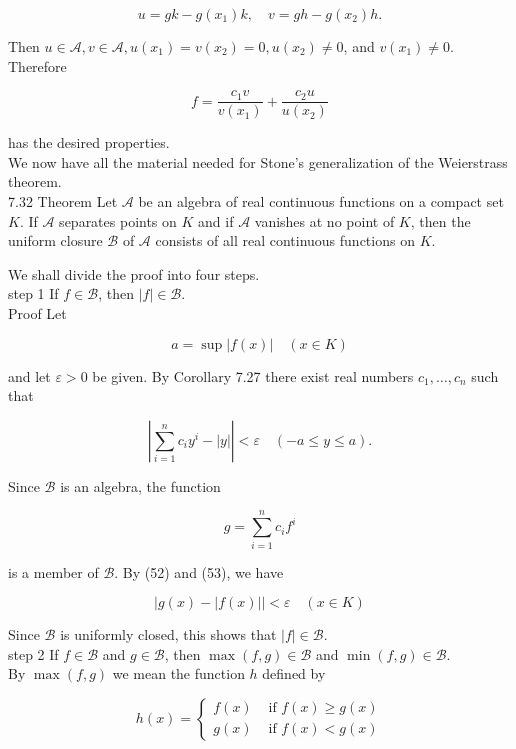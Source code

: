 \documentclass[10pt]{article}
\begin{document}
$$
u=g k-g\left(x_{1}\right) k, \quad v=g h-g\left(x_{2}\right) h .
$$

Then $u \in \mathscr{A}, v \in \mathscr{A}, u\left(x_{1}\right)=v\left(x_{2}\right)=0, u\left(x_{2}\right) \neq 0$, and $v\left(x_{1}\right) \neq 0$. Therefore

$$
f=\frac{c_{1} v}{v\left(x_{1}\right)}+\frac{c_{2} u}{u\left(x_{2}\right)}
$$

has the desired properties.\\
We now have all the material needed for Stone's generalization of the Weierstrass theorem.\\
7.32 Theorem Let $\mathscr{A}$ be an algebra of real continuous functions on a compact set $K$. If $\mathscr{A}$ separates points on $K$ and if $\mathscr{A}$ vanishes at no point of $K$, then the uniform closure $\mathscr{B}$ of $\mathscr{A}$ consists of all real continuous functions on $K$.

We shall divide the proof into four steps.\\
step 1 If $f \in \mathscr{B}$, then $|f| \in \mathscr{B}$.\\
Proof Let


\begin{equation*}
a=\sup |f(x)| \quad(x \in K) \tag{52}
\end{equation*}


and let $\varepsilon>0$ be given. By Corollary 7.27 there exist real numbers $c_{1}, \ldots, c_{n}$ such that


\begin{equation*}
\left|\sum_{i=1}^{n} c_{i} y^{i}-|y|\right|<\varepsilon \quad(-a \leq y \leq a) . \tag{53}
\end{equation*}


Since $\mathscr{B}$ is an algebra, the function

$$
g=\sum_{i=1}^{n} c_{i} f^{i}
$$

is a member of $\mathscr{B}$. By (52) and (53), we have

$$
|g(x)-|f(x)||<\varepsilon \quad(x \in K)
$$

Since $\mathscr{B}$ is uniformly closed, this shows that $|f| \in \mathscr{B}$.\\
step 2 If $f \in \mathscr{B}$ and $g \in \mathscr{B}$, then $\max (f, g) \in \mathscr{B}$ and $\min (f, g) \in \mathscr{B}$.\\
By $\max (f, g)$ we mean the function $h$ defined by

$$
h(x)= \begin{cases}f(x) & \text { if } f(x) \geq g(x) \\ g(x) & \text { if } f(x)<g(x)\end{cases}
$$
\end{document}
